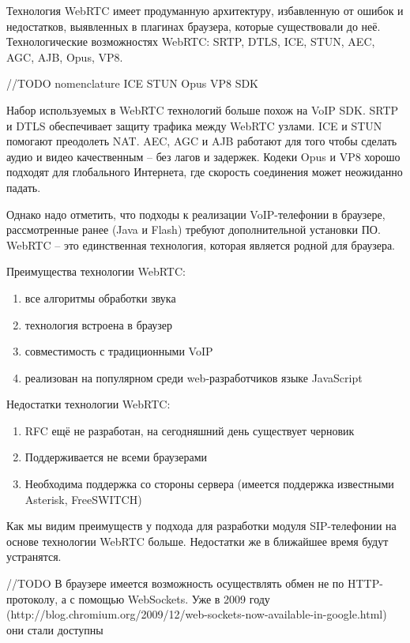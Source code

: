 Технология WebRTC имеет продуманную архитектуру, избавленную от ошибок и недостатков, выявленных в плагинах браузера, которые существовали до неё. Технологические возможностях WebRTC: SRTP, DTLS, ICE, STUN, AEC, AGC, AJB, Opus, VP8.

//TODO nomenclature ICE STUN Opus VP8 SDK

Набор используемых в WebRTC технологий больше похож на VoIP SDK. SRTP и DTLS обеспечивает защиту трафика между WebRTC узлами. ICE и STUN помогают преодолеть NAT.\cite{sip_nat} AEC, AGC и AJB работают для того чтобы сделать аудио и видео качественным – без лагов и задержек. Кодеки Opus и VP8 хорошо подходят для глобального Интернета, где скорость соединения может неожиданно падать.

Однако надо отметить, что подходы к реализации VoIP-телефонии в браузере, рассмотренные ранее (Java и Flash) требуют дополнительной установки ПО. WebRTC – это единственная технология, которая является родной для браузера.

Преимущества технологии WebRTC:
\begin{enumerate}
\item все алгоритмы обработки звука
\item технология встроена в браузер
\item совместимость с традиционными VoIP
\item реализован на популярном среди web-разработчиков языке JavaScript
\end{enumerate}

Недостатки технологии WebRTC:
\begin{enumerate}
\item RFC ещё не разработан, на сегодняшний день существует черновик\cite{WebRTC_W3C}
\item Поддерживается не всеми браузерами
\item Необходима поддержка со стороны сервера (имеется поддержка известными Asterisk, FreeSWITCH)
\end{enumerate}

Как мы видим преимуществ у подхода для разработки модуля SIP-телефонии на основе технологии WebRTC больше. Недостатки же в ближайшее время будут устранятся.

//TODO
В браузере имеется возможность осуществлять обмен не по HTTP-протоколу, а с помощью WebSockets. Уже в 2009 году (http://blog.chromium.org/2009/12/web-sockets-now-available-in-google.html) они стали доступны
